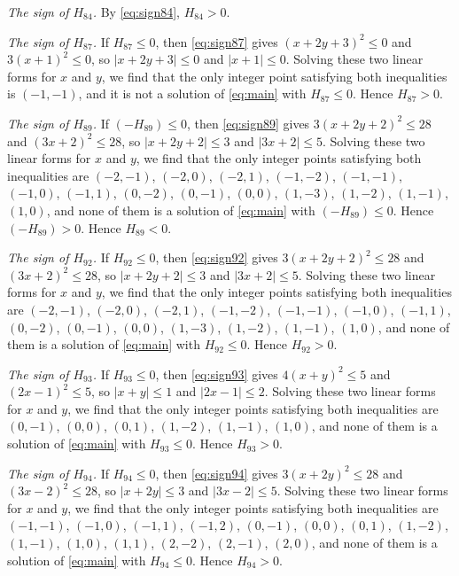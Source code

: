 \documentclass[11pt]{article}
\begin{document}
\emph{The sign of $H_{84}$.} By \eqref{eq:sign84}, $H_{84}>0$.

\emph{The sign of $H_{87}$.} If $H_{87}\leq0$, then \eqref{eq:sign87} gives $(x+2y+3)^2\leq 0$ and $3(x+1)^2\leq 0$, so $|x+2y+3|\leq0$ and $|x+1|\leq0$. Solving these two linear forms for $x$ and $y$, we find that the only integer point satisfying both inequalities is $(-1,-1)$, and it is not a solution of \eqref{eq:main} with $H_{87}\leq0$. Hence $H_{87}>0$.

\emph{The sign of $H_{89}$.} If $(-H_{89})\leq0$, then \eqref{eq:sign89} gives $3(x+2y+2)^2\leq 28$ and $(3x+2)^2\leq 28$, so $|x+2y+2|\leq3$ and $|3x+2|\leq5$. Solving these two linear forms for $x$ and $y$, we find that the only integer points satisfying both inequalities are $(-2,-1)$, $(-2,0)$, $(-2,1)$, $(-1,-2)$, $(-1,-1)$, $(-1,0)$, $(-1,1)$, $(0,-2)$, $(0,-1)$, $(0,0)$, $(1,-3)$, $(1,-2)$, $(1,-1)$, $(1,0)$, and none of them is a solution of \eqref{eq:main} with $(-H_{89})\leq0$. Hence $(-H_{89})>0$. Hence $H_{89}<0$.

\emph{The sign of $H_{92}$.} If $H_{92}\leq0$, then \eqref{eq:sign92} gives $3(x+2y+2)^2\leq 28$ and $(3x+2)^2\leq 28$, so $|x+2y+2|\leq3$ and $|3x+2|\leq5$. Solving these two linear forms for $x$ and $y$, we find that the only integer points satisfying both inequalities are $(-2,-1)$, $(-2,0)$, $(-2,1)$, $(-1,-2)$, $(-1,-1)$, $(-1,0)$, $(-1,1)$, $(0,-2)$, $(0,-1)$, $(0,0)$, $(1,-3)$, $(1,-2)$, $(1,-1)$, $(1,0)$, and none of them is a solution of \eqref{eq:main} with $H_{92}\leq0$. Hence $H_{92}>0$.

\emph{The sign of $H_{93}$.} If $H_{93}\leq0$, then \eqref{eq:sign93} gives $4(x+y)^2\leq 5$ and $(2x-1)^2\leq 5$, so $|x+y|\leq1$ and $|2x-1|\leq2$. Solving these two linear forms for $x$ and $y$, we find that the only integer points satisfying both inequalities are $(0,-1)$, $(0,0)$, $(0,1)$, $(1,-2)$, $(1,-1)$, $(1,0)$, and none of them is a solution of \eqref{eq:main} with $H_{93}\leq0$. Hence $H_{93}>0$.

\emph{The sign of $H_{94}$.} If $H_{94}\leq0$, then \eqref{eq:sign94} gives $3(x+2y)^2\leq 28$ and $(3x-2)^2\leq 28$, so $|x+2y|\leq3$ and $|3x-2|\leq5$. Solving these two linear forms for $x$ and $y$, we find that the only integer points satisfying both inequalities are $(-1,-1)$, $(-1,0)$, $(-1,1)$, $(-1,2)$, $(0,-1)$, $(0,0)$, $(0,1)$, $(1,-2)$, $(1,-1)$, $(1,0)$, $(1,1)$, $(2,-2)$, $(2,-1)$, $(2,0)$, and none of them is a solution of \eqref{eq:main} with $H_{94}\leq0$. Hence $H_{94}>0$.
\end{document}
